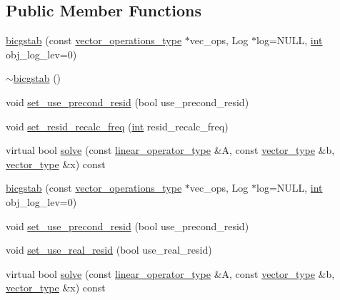 \subsection*{Public Member Functions}
\begin{DoxyCompactItemize}
\item 
\hyperlink{classnumerical__algos_1_1lin__solvers_1_1bicgstab_a2ef7808628f564b8cdc9aed0f108ebda}{bicgstab} (const \hyperlink{classnumerical__algos_1_1lin__solvers_1_1bicgstab_a6ff5c085063b744de8b72fd42bd45f33}{vector\-\_\-operations\-\_\-type} $\ast$vec\-\_\-ops, Log $\ast$log=N\-U\-L\-L, \hyperlink{classint}{int} obj\-\_\-log\-\_\-lev=0)
\item 
\hyperlink{classnumerical__algos_1_1lin__solvers_1_1bicgstab_ae84e9e1ede472200f7f2ca5eacbb4389}{$\sim$bicgstab} ()
\item 
void \hyperlink{classnumerical__algos_1_1lin__solvers_1_1bicgstab_a61ef325066d9edb6529fb1fca673d6c1}{set\-\_\-use\-\_\-precond\-\_\-resid} (bool use\-\_\-precond\-\_\-resid)
\item 
void \hyperlink{classnumerical__algos_1_1lin__solvers_1_1bicgstab_a9f90b0901edd43e3c67d900688e436d3}{set\-\_\-resid\-\_\-recalc\-\_\-freq} (\hyperlink{classint}{int} resid\-\_\-recalc\-\_\-freq)
\item 
virtual bool \hyperlink{classnumerical__algos_1_1lin__solvers_1_1bicgstab_ac3df95058825e4a8a1ed6bf838f10669}{solve} (const \hyperlink{classnumerical__algos_1_1lin__solvers_1_1bicgstab_a77f7bc99b7f22986f73ce7d2b4ebd669}{linear\-\_\-operator\-\_\-type} \&A, const \hyperlink{classnumerical__algos_1_1lin__solvers_1_1bicgstab_a3525de8fe1598864ceac98c83bd0d477}{vector\-\_\-type} \&b, \hyperlink{classnumerical__algos_1_1lin__solvers_1_1bicgstab_a3525de8fe1598864ceac98c83bd0d477}{vector\-\_\-type} \&x) const 
\item 
\hyperlink{classnumerical__algos_1_1lin__solvers_1_1bicgstab_a2ef7808628f564b8cdc9aed0f108ebda}{bicgstab} (const \hyperlink{classnumerical__algos_1_1lin__solvers_1_1bicgstab_a6ff5c085063b744de8b72fd42bd45f33}{vector\-\_\-operations\-\_\-type} $\ast$vec\-\_\-ops, Log $\ast$log=N\-U\-L\-L, \hyperlink{classint}{int} obj\-\_\-log\-\_\-lev=0)
\item 
void \hyperlink{classnumerical__algos_1_1lin__solvers_1_1bicgstab_a61ef325066d9edb6529fb1fca673d6c1}{set\-\_\-use\-\_\-precond\-\_\-resid} (bool use\-\_\-precond\-\_\-resid)
\item 
void \hyperlink{classnumerical__algos_1_1lin__solvers_1_1bicgstab_ae69b7e9da24cba334a330781d0f00c98}{set\-\_\-use\-\_\-real\-\_\-resid} (bool use\-\_\-real\-\_\-resid)
\item 
virtual bool \hyperlink{classnumerical__algos_1_1lin__solvers_1_1bicgstab_ac3df95058825e4a8a1ed6bf838f10669}{solve} (const \hyperlink{classnumerical__algos_1_1lin__solvers_1_1bicgstab_a77f7bc99b7f22986f73ce7d2b4ebd669}{linear\-\_\-operator\-\_\-type} \&A, const \hyperlink{classnumerical__algos_1_1lin__solvers_1_1bicgstab_a3525de8fe1598864ceac98c83bd0d477}{vector\-\_\-type} \&b, \hyperlink{classnumerical__algos_1_1lin__solvers_1_1bicgstab_a3525de8fe1598864ceac98c83bd0d477}{vector\-\_\-type} \&x) const 
\end{DoxyCompactItemize}
